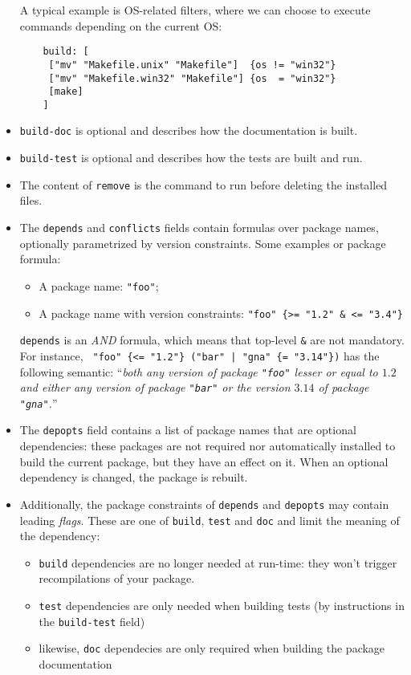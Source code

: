 \documentclass[a4paper,10pt]{article}
\begin{document}
\begin{itemize}
   A typical example is OS-related filters, where we can choose
   to execute commands depending on the current OS:

  \begin{Verbatim}
    build: [
     ["mv" "Makefile.unix" "Makefile"]  {os != "win32"}
     ["mv" "Makefile.win32" "Makefile"] {os  = "win32"}
     [make]
    ]
  \end{Verbatim}

\item {\tt build-doc} is optional and describes how the documentation
  is built.

\item {\tt build-test} is optional and describes how the tests are
  built and run.

\item The content of {\tt remove} is the command to run before deleting
  the installed files.

\item The {\tt depends} and {\tt conflicts} fields
  contain formulas over package names, optionally parametrized by
  version constraints. Some examples or package formula:

\begin{itemize}
\item A package name: {\tt "foo"};
\item A package name with version constraints:
  \verb+"foo" {>= "1.2" & <= "3.4"}+
\end{itemize}

{\tt depends} is an {\em AND} formula, which means that top-level
\verb+&+ are not mandatory. For instance,
 \verb+ "foo" {<= "1.2"} ("bar" | "gna" {= "3.14"})+ has the following
 semantic:  ``{\em both any version of package
  {\tt "foo"} lesser or equal to $1.2$ and either any version of package
  {\tt "bar"} or the version $3.14$ of package {\tt "gna"}.}''  \\

\item The {\tt depopts} field contains a list of package names that are optional
  dependencies: these packages are not required nor automatically installed
  to build the current package, but they have an effect on it. When an optional
  dependency is changed, the package is rebuilt.

\item Additionally, the package constraints of {\tt depends} and {\tt depopts}
  may contain leading {\em flags}. These are one of \verb+build+, \verb+test+
  and \verb+doc+ and limit the meaning of the dependency:
  \begin{itemize}
  \item \verb+build+ dependencies are no longer needed at run-time: they won't
    trigger recompilations of your package.
  \item \verb+test+ dependencies are only needed when building tests
    (by instructions in the \verb+build-test+ field)
  \item likewise, \verb+doc+ dependecies are only required when building the
    package documentation
  \end{itemize}


\end{itemize}
\end{document}
